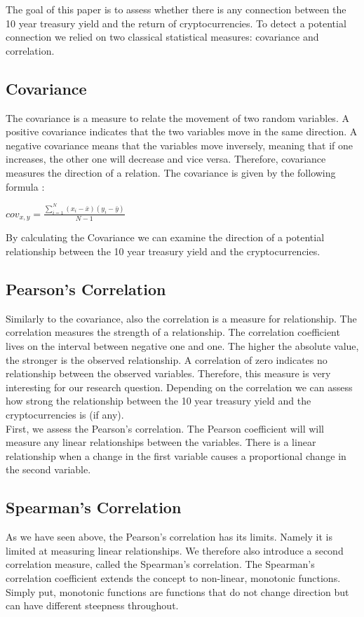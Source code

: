 The goal of this paper is to assess whether there is any connection between the 10 year treasury yield and the return of cryptocurrencies. To detect a potential connection we relied on two classical statistical measures: covariance and correlation.

\subsection{Covariance}
The covariance is a measure to relate the movement of two random variables. A positive covariance indicates that the two variables move in the same direction. A negative covariance means that the variables move inversely, meaning that if one increases, the other one will decrease and vice versa. Therefore, covariance measures the direction of a relation. The covariance is given by the following formula \citep{cov}:
\begin{center}
   \large $cov_{x,y}=\frac{\sum_{i=1}^{N}(x_{i}-\bar{x})(y_{i}-\bar{y})}{N-1}$
\end{center}
By calculating the Covariance we can examine the direction of a potential relationship between the 10 year treasury yield and the cryptocurrencies.

\subsection{Pearson's Correlation}
Similarly to the covariance, also the correlation is a measure for relationship. The correlation measures the strength of a relationship. The correlation coefficient lives on the interval between negative one and one. The higher the absolute value, the stronger is the observed relationship. A correlation of zero indicates no relationship between the observed variables. Therefore, this measure is very interesting for our research question. Depending on the correlation we can assess how strong the relationship between the 10 year treasury yield and the cryptocurrencies is (if any).\\

First, we assess the Pearson's correlation. The Pearson coefficient will will measure any linear relationships between the variables. There is a linear relationship when a change in the first variable causes a proportional change in the second variable. \citep{corr}


\subsection{Spearman's Correlation}
As we have seen above, the Pearson's correlation has its limits. Namely it is limited at measuring linear relationships. We therefore also introduce a second correlation measure, called the Spearman's correlation. The Spearman’s correlation coefficient extends the concept to non-linear, monotonic functions. Simply put, monotonic functions are functions that do not change direction but can have different steepness throughout. \citep{corr}


